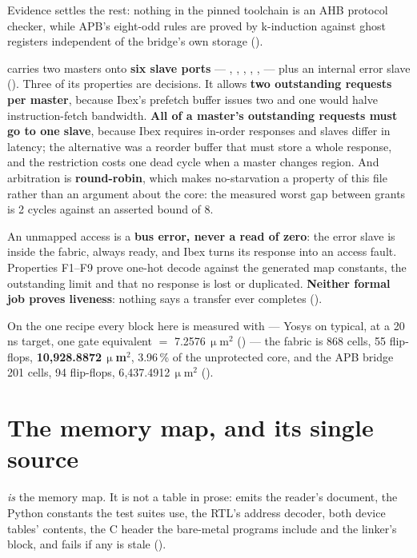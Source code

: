 Evidence settles the rest: nothing in the pinned toolchain is an AHB
protocol checker, while APB's eight-odd rules are proved by k-induction
against ghost registers independent of the bridge's own storage
().

 carries two masters onto \textbf{six slave ports} ---
, , , , ,
 --- plus an internal error slave ().
Three of its properties are decisions. It allows \textbf{two outstanding
requests per master}, because Ibex's prefetch buffer issues two and one
would halve instruction-fetch bandwidth. \textbf{All of a master's
outstanding requests must go to one slave}, because Ibex requires
in-order responses and slaves differ in latency; the alternative was a
reorder buffer that must store a whole response, and the restriction
costs one dead cycle when a master changes region. And arbitration is
\textbf{round-robin}, which makes no-starvation a property of this file
rather than an argument about the core: the measured worst gap between
grants is 2 cycles against an asserted bound of 8.

An unmapped access is a \textbf{bus error, never a read of zero}: the
error slave is inside the fabric, always ready, and Ibex turns its
response into an access fault. Properties F1--F9 prove one-hot decode against the generated map
constants, the outstanding limit and that no response is lost or
duplicated. \textbf{Neither formal job proves liveness}: nothing says a
transfer ever completes ().

On the one recipe every block here is measured with --- Yosys
 on  typical,  at a 20\,ns
target, one gate equivalent $=$ 7.2576\,$\upmu$m$^2$ ()
--- the fabric is 868
cells, 55 flip-flops, \textbf{10{,}928.8872\,$\upmu$m$^2$}, 3.96\,\% of the
unprotected core, and the APB bridge 201 cells, 94 flip-flops,
6{,}437.4912\,$\upmu$m$^2$ ().

\section{The memory map, and its single source}

\begin{sloppypar}
 \emph{is} the memory map. It is not a table in
prose:  emits the reader's document, the
Python constants the test suites use, the RTL's address decoder, both
device tables' contents, the C header the bare-metal programs include and
the linker's  block, and 
fails if any is stale ().
\end{sloppypar}

